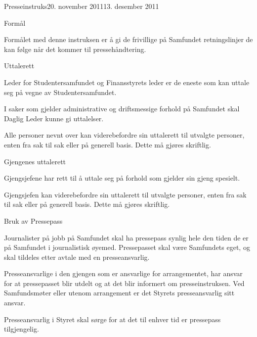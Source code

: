 \begin{instruks}{Presseinstruks}{20. november 2011}{13. desember 2011}


    \begin{instruksledd}{Formål}

        Formålet med denne instruksen er å gi de frivillige på Samfundet retningslinjer de kan følge når det kommer til pressehåndtering.

    \end{instruksledd}


    \begin{instruksledd}{Uttalerett}

       Leder for Studentersamfundet og Finansstyrets leder er de eneste som kan uttale seg på vegne av Studentersamfundet.


I saker som gjelder administrative og driftsmessige forhold på Samfundet skal Daglig Leder kunne gi uttalelser.


Alle personer nevnt over kan viderebefordre sin uttalerett til utvalgte personer, enten fra sak til sak eller på generell basis. Dette må gjøres skriftlig.

    \end{instruksledd}


    \begin{instruksledd}{Gjengenes uttalerett}

Gjengsjefene har rett til å uttale seg på forhold som gjelder sin gjeng spesielt.


Gjengsjefen kan viderebefordre sin uttalerett til utvalgte personer, enten fra sak til sak eller på generell basis. Dette må gjøres skriftlig.

    \end{instruksledd}

\begin{instruksledd}{Bruk av Pressepass}

Journalister på jobb på Samfundet skal ha pressepass synlig hele den tiden de er på Samfundet i journalistisk øyemed. Pressepasset skal være Samfundets eget, og skal tildeles etter avtale med en presseansvarlig. 


Presseansvarlige i den gjengen som er ansvarlige for arrangementet, har ansvar for at pressepasset blir utdelt og at det blir informert om presseinstruksen. Ved Samfundsmøter eller utenom arrangement er det Styrets presseansvarlig sitt ansvar.


Presseansvarlig i Styret skal sørge for at det til enhver tid er pressepass tilgjengelig.


\end{instruksledd}
\end{instruks}
